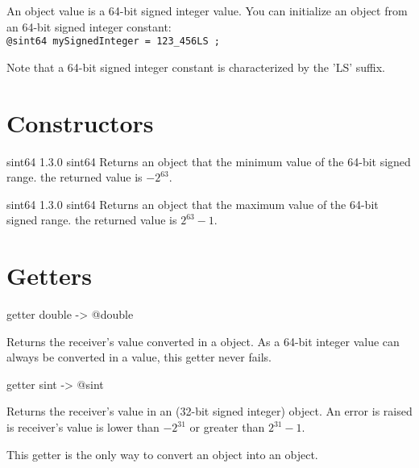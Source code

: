 

An  object value is a 64-bit signed integer value. You can initialize an  object from an 64-bit signed integer constant:\\

\texttt{@sint64 mySignedInteger = 123\_456LS ;}

Note that a 64-bit signed integer constant is characterized by the 'LS' suffix.

\section{Constructors}


{sint64}
{1.3.0}
{sint64}
{Returns an  object that the minimum value of the 64-bit signed range.}
{the returned value is $-2^{63}$.}





{sint64}
{1.3.0}
{sint64}
{Returns an  object that the maximum value of the 64-bit signed range.}
{the returned value is $2^{63}-1$.}


\section{Getters}



\begin{galgascode}
getter double -> @double
\end{galgascode}

Returns the receiver's value converted in a  object. As a 64-bit integer value can always be converted in a  value, this getter never fails.





\begin{galgascode}
getter sint -> @sint
\end{galgascode}

Returns the receiver's value in an  (32-bit signed integer) object. An error is raised is receiver's value is lower than $-2^{31}$ or greater than $2^{31}-1$.

This getter is the only way to convert an  object into an  object.





